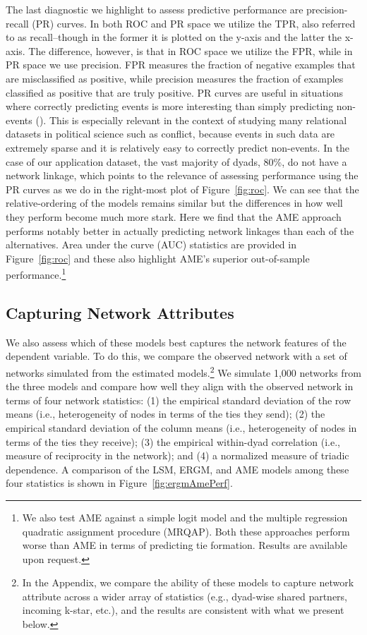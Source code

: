 The last diagnostic we highlight to assess predictive performance are precision-recall (PR) curves. In both ROC and PR space we utilize the TPR, also referred to as recall--though in the former it is plotted on the y-axis and the latter the x-axis. The difference, however, is that in ROC space we utilize the FPR, while in PR space we use precision. FPR measures the fraction of negative examples that are misclassified as positive, while precision measures the fraction of examples classified as positive that are truly positive. PR curves are useful in situations where correctly predicting events is more interesting than simply predicting non-events (\citealt{davis:goadrich:2006}). This is especially relevant in the context of studying many relational datasets in political science such as conflict, because events in such data are extremely sparse and it is relatively easy to correctly predict non-events. In the case of our application dataset, the vast majority of dyads, 80\%, do not have a network linkage, which points to the relevance of assessing performance using the PR curves as we do in the right-most plot of Figure~\ref{fig:roc}. We can see that the relative-ordering of the models remains similar but the differences in how well they perform become much more stark. Here we find that the AME approach performs notably better in actually predicting network linkages than each of the alternatives. Area under the curve (AUC) statistics are provided in Figure~\ref{fig:roc} and these also highlight AME's superior out-of-sample performance.\footnote{We also test AME against a simple logit model and the multiple regression quadratic assignment procedure (MRQAP). Both these approaches perform worse than AME in terms of predicting tie formation. Results are available upon request.}

\FloatBarrier

\subsection*{Capturing Network Attributes}

We also assess which of these models best captures the network features of the dependent variable. To do this, we compare the observed network with a set of networks simulated from the estimated models.\footnote{In the Appendix, we compare the ability of these models to capture network attribute across a wider array of statistics (e.g., dyad-wise shared partners, incoming k-star, etc.), and the results are consistent with what we present below.} We simulate 1,000 networks from the three models and compare how well they align with the observed network in terms of four network statistics: (1) the empirical standard deviation of the row means (i.e., heterogeneity of nodes in terms of the ties they send); (2) the empirical standard deviation of the column means (i.e., heterogeneity of nodes in terms of the ties they receive); (3) the empirical within-dyad correlation (i.e., measure of reciprocity in the network); and (4) a normalized measure of triadic dependence. A comparison of the LSM, ERGM, and AME models among these four statistics is shown in Figure~\ref{fig:ergmAmePerf}.

